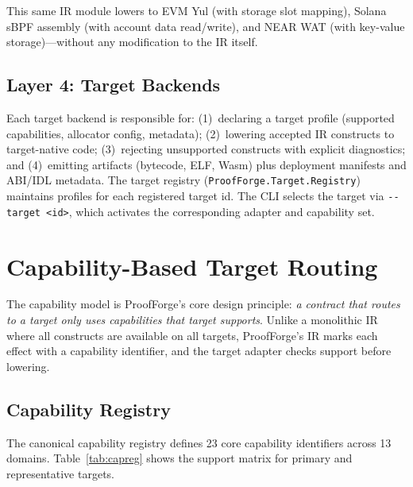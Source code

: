 \documentclass[sigconf]{acmart}
\begin{document}
This same IR module lowers to EVM Yul (with storage slot mapping), Solana sBPF assembly (with
account data read/write), and NEAR WAT (with key-value storage)---without any modification to
the IR itself.

\subsection{Layer 4: Target Backends}

Each target backend is responsible for: (1)~declaring a target profile (supported capabilities,
allocator config, metadata); (2)~lowering accepted IR constructs to target-native code;
(3)~rejecting unsupported constructs with explicit diagnostics; and (4)~emitting artifacts
(bytecode, ELF, Wasm) plus deployment manifests and ABI/IDL metadata. The target registry
(\texttt{ProofForge.Target.Registry}) maintains profiles for each registered target id. The
CLI selects the target via \texttt{-{}-target~<id>}, which activates the corresponding adapter
and capability set.

\section{Capability-Based Target Routing}
\label{sec:cap}

The capability model is ProofForge's core design principle: \emph{a contract that routes to a
target only uses capabilities that target supports}. Unlike a monolithic IR where all constructs
are available on all targets, ProofForge's IR marks each effect with a capability identifier,
and the target adapter checks support before lowering.

\subsection{Capability Registry}

The canonical capability registry defines 23 core capability identifiers across 13 domains.
Table~\ref{tab:capreg} shows the support matrix for primary and representative targets.
\end{document}
